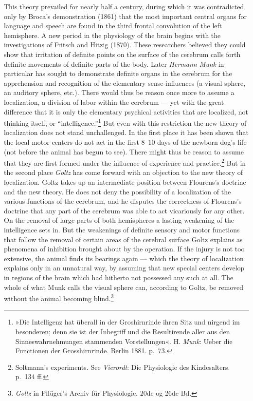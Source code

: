 \documentclass[12pt,a4paper]{book}
\newcommand{\opage}[1]{\marginnote{\footnotesize\textit{[#1]}}}
\begin{document}
This theory prevailed for nearly half a century, during which it was
contradicted only by Broca's demonstration (1861) that the most
important central organs for language and speech are found in the third
frontal convolution of the left hemisphere. A new period in the
physiology of the brain begins with the investigations of Fritsch and
Hitzig (1870). These researchers believed they could show that
irritation of definite points on the surface of the cerebrum calls forth
definite movements of definite parts of the body. Later \emph{Hermann
Munk} in particular has sought to demonstrate definite organs in the
cerebrum for the apprehension and recognition of the elementary
sense-influences (a visual sphere, an auditory sphere, etc.). There
would thus be reason once more to assume a localization, a division of
labor within the cerebrum --- yet with the great difference that it is
only the elementary psychical activities
\opage{50}that are localized, not thinking itself, or
``intelligence.''\footnote{»Die Intelligenz hat überall in der
Groshirnrinde ihren Sitz und nirgend im besonderen; denn sie ist der
Inbegriff und die Resultirende aller aus den Sinneswahrnehmungen
stammenden Vorstellungen«. H. \emph{Munk}: Ueber die Functionen der
Grosshirnrinde. Berlin 1881. p.~73.} But even with this restriction the
new theory of localization does not stand unchallenged. In the first
place it has been shown that the local motor centers do not act in the
first 8--10 days of the newborn dog's life (not before the animal has
begun to see). There might thus be reason to assume that they are first
formed under the influence of experience and practice.\footnote{Soltmann's
experiments. See \emph{Vierordt}: Die Physiologie des Kindesalters.
p.~134 ff.} But in the second place \emph{Goltz} has come forward with
an objection to the new theory of localization. Goltz takes up an
intermediate position between Flourens's doctrine and the new theory.
He does not deny the possibility of a localization of the various
functions of the cerebrum, and he disputes the correctness of Flourens's
doctrine that any part of the cerebrum was able to act vicariously for
any other. On the removal of large parts of both hemispheres a lasting
weakening of the intelligence sets in. But the weakenings of definite
sensory and motor functions that follow the removal of certain areas of
the cerebral surface Goltz explains as phenomena of inhibition brought
about by the operation. If the injury is not too extensive, the animal
finds its bearings again --- which the theory of localization explains
only in an unnatural way, by assuming that new special centers develop
in regions of the brain which had hitherto not possessed any such at
all. The whole of what Munk calls the visual sphere can, according to
Goltz, be removed without the animal becoming
blind.\footnote{\emph{Goltz} in Pflüger's Archiv für Physiologie. 20de
og 26de Bd.}
\end{document}

